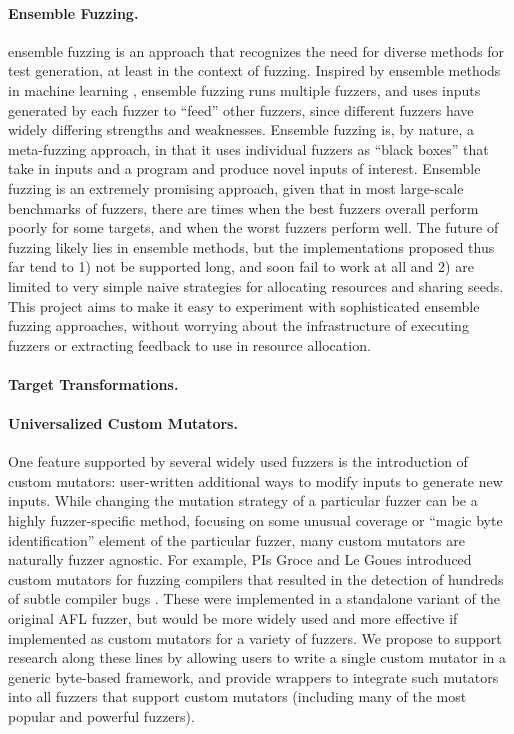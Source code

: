 \documentclass[numbers]{proposalnsf}
\begin{document}
\paragraph{Ensemble Fuzzing.}   ensemble fuzzing \cite{chen2019enfuzz} is an approach that recognizes the need for
diverse methods for test generation, at least in the context of
fuzzing.   Inspired by ensemble methods in machine learning \cite{dietterich2002ensemble},
ensemble fuzzing runs multiple fuzzers, and uses inputs generated by
each fuzzer to ``feed'' other fuzzers, since different fuzzers have widely differing strengths and weaknesses. Ensemble fuzzing is, by nature, a meta-fuzzing approach, in that it uses individual fuzzers as ``black boxes'' that take in inputs and a program and produce novel inputs of interest.  Ensemble fuzzing is an extremely promising approach, given that in most large-scale benchmarks of fuzzers, there are times when the best fuzzers overall perform poorly for some targets, and when the worst fuzzers perform well.  The future of fuzzing likely lies in ensemble methods, but the implementations proposed thus far tend to 1) not be supported long, and soon fail to work at all and 2) are limited to very simple naive strategies for allocating resources and sharing seeds.  This project aims to make it easy to experiment with sophisticated ensemble fuzzing approaches, without worrying about the infrastructure of executing fuzzers or extracting feedback to use in resource allocation.

\paragraph{Target Transformations.}

\paragraph{Universalized Custom Mutators.}  One feature supported by several widely used fuzzers is the introduction of custom mutators:  user-written additional ways to modify inputs to generate new inputs.  While changing the mutation strategy of a particular fuzzer can be a highly fuzzer-specific method, focusing on some unusual coverage or ``magic byte identification'' element of the particular fuzzer, many custom mutators are naturally fuzzer agnostic.  For example, PIs Groce and Le Goues introduced custom mutators for fuzzing compilers that resulted in the detection of hundreds of subtle compiler bugs \cite{CC22}.  These were implemented in a standalone variant of the original AFL fuzzer, but would be more widely used and more effective if implemented as custom mutators for a variety of fuzzers.  We propose to support research along these lines by allowing users to write a single custom mutator in a generic byte-based framework, and provide wrappers to integrate such mutators into all fuzzers that support custom mutators (including many of the most popular and powerful fuzzers).
   
\end{document}
